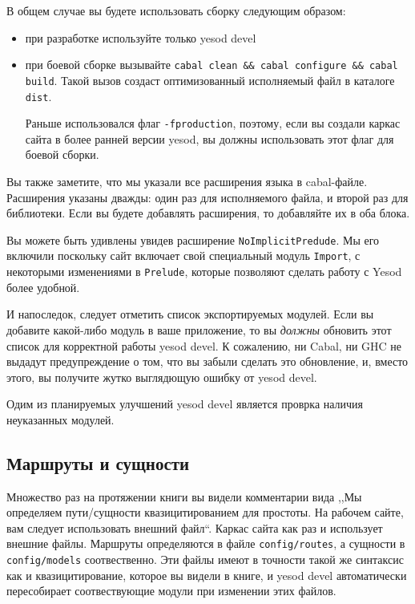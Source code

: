 В общем случае вы будете использовать сборку следующим образом:
\begin{itemize}
  \item при разработке используйте только yesod devel
  \item при боевой сборке вызывайте \lstinline!cabal clean && cabal configure && cabal build!. Такой вызов
    создаст оптимизованный исполняемый файл в каталоге \lstinline!dist!.
    \begin{remark}
      Раньше использовался флаг \lstinline!-fproduction!, поэтому, если вы создали каркас сайта в более ранней
      версии yesod, вы должны использовать этот флаг для боевой сборки.
    \end{remark}
\end{itemize}

Вы также заметите, что мы указали все расширения языка в cabal-файле. Расширения указаны дважды:
один раз для исполняемого файла, и второй раз для библиотеки. Если вы будете добавлять расширения, то
добавляйте их в оба блока.

Вы можете быть удивлены увидев расширение \lstinline!NoImplicitPredude!. Мы его включили поскольку сайт
включает свой специальный модуль \lstinline!Import!, с некоторыми изменениями в \lstinline!Prelude!, которые
позволяют сделать работу с Yesod более удобной.

И напоследок, следует отметить список экспортируемых модулей. Если вы добавите какой-либо модуль в
ваше приложение, то вы \emph{должны} обновить этот список для корректной работы yesod devel. К сожалению,
ни Cabal, ни GHC не выдадут предупреждение о том, что вы забыли сделать это обновление, и, вместо этого,
вы получите жутко выглядющую ошибку от yesod devel.
\begin{remark}
  Одим из планируемых улучшений yesod devel является проврка наличия неуказанных модулей.
\end{remark}

\subsection{Маршруты и сущности}

Множество раз на протяжении книги вы видели комментарии вида ,,Мы определяем пути/сущности
квазицитированием для простоты. На рабочем сайте, вам следует использовать внешний файл``.
Каркас сайта как раз и использует внешние файлы.
Маршруты определяются в файле \lstinline!config/routes!, а сущности в \lstinline!config/models!
соотвественно. Эти файлы имеют в точности такой же синтаксис как и квазицитирование, которое вы
видели в книге, и yesod devel автоматически пересобирает соотвествующие модули при изменении этих файлов.

